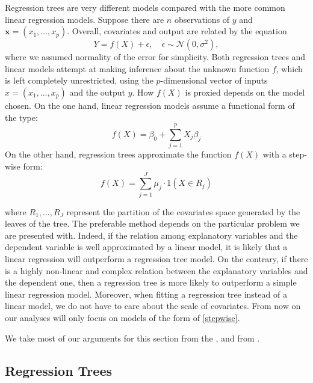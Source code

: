 \documentclass[a4paper,11pt]{article}
\begin{document}
Regression trees are very different models compared with the more common linear regression models.  Suppose there are $n$ observations of $y$ and $\mathbf{x} = (x_1, \ldots, x_p)$. Overall, covariates and output are related by the equation
\begin{equation}
    Y = f(X) + \epsilon, \quad \epsilon \sim \mathcal{N}(0, \sigma^2), \label{regression}
\end{equation}
where we assumed normality of the error for simplicity.
Both regression trees and linear models attempt at making inference about the unknown function \( f \), which is left completely unrestricted, using the \( p \)-dimensional vector of inputs \( x = (x_1, \dots, x_p) \) and the output $y$. 
How $f(X)$ is proxied depends on the model chosen. On the one hand, linear regression models assume a functional form of the type:
\begin{equation}
  f(X) = \beta_0 + \sum_{j=1}^p X_j \beta_j
\end{equation}
On the other hand, regression trees approximate the function $f(X)$ with a step-wise form: 
\begin{equation}
  f(X) = \sum_{j=1}^J \mu_j \cdot 1(X \in R_j) \label{stepwise}
\end{equation}

where $R_1, ..., R_J$ represent the partition of the covariates space generated by the leaves of the tree.
The preferable method depends on the particular problem we are presented with. Indeed, if the relation among explanatory variables and the dependent variable is well approximated by a linear model, it is likely that a linear regression will outperform a regression tree model. On the contrary, if there is a highly non-linear and complex relation between the explanatory variables and the dependent one, then a regression tree is more likely to outperform a simple linear regression model. Moreover, when fitting a regression tree instead of a linear model, we do not have to care about the scale of covariates.
From now on our analyses will only focus on models of the form of \eqref{stepwise}.

We take most of our arguments for this section from the \cite[Chapter~8]{jamesIntroductionStatisticalLearning2021}, and from \cite{Random Forest with R}.

\subsection{Regression Trees}
 
\end{document}
